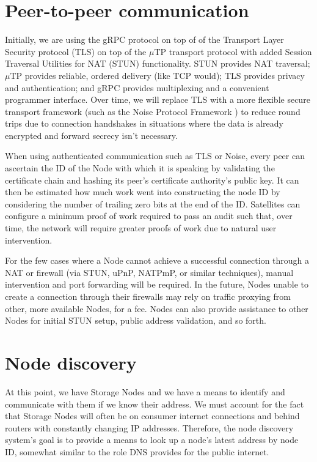 \documentclass[8pt,fleqn,openany]{book}
\begin{document}
\section{Peer-to-peer communication}

Initially, we are using the gRPC \cite{grpc} protocol on top of of the
Transport Layer Security protocol (TLS) on top of the $\mu$TP
\cite{utp} transport protocol with added Session Traversal Utilities for NAT
(STUN) functionality. STUN provides NAT traversal; $\mu$TP provides reliable,
ordered delivery (like TCP would); TLS provides privacy and authentication;
and gRPC provides multiplexing and a convenient programmer interface.
Over time, we will replace TLS with a more flexible secure transport
framework (such as the Noise Protocol Framework \cite{noise-proto}) to
reduce round trips due to connection handshakes in situations where the data is
already encrypted and forward secrecy isn't necessary.

When using authenticated communication such as TLS or Noise, every peer can
ascertain the ID of the Node with which it is
speaking by validating the certificate chain and hashing its peer's
certificate authority's public key. It can then be estimated how much work went
into constructing the node ID by considering the number of trailing zero bits
at the end of the ID.
Satellites can configure a minimum proof of work required to pass an
audit such that, over time, the network will require greater proofs of work
due to natural user intervention.

For the few cases where a Node cannot achieve a successful connection through a
NAT or firewall (via STUN, uPnP, NATPmP, or similar techniques), manual
intervention and port forwarding will be required. In the future, Nodes unable
to create a connection through their firewalls may rely on traffic proxying from
other, more available Nodes, for a fee. Nodes can also provide
assistance to other Nodes for initial STUN setup, public address validation,
and so forth.

\section{Node discovery}\label{sec:concrete-node-discovery}

At this point, we have Storage Nodes and we have a means to identify and
communicate with
them if we know their address. We must account for the fact that Storage Nodes
will often be on consumer internet connections and behind routers with
constantly changing IP
addresses. Therefore, the node discovery system's goal is to provide a means to look
up a node's latest address by node ID, somewhat similar to the role DNS
provides for the public internet.
\end{document}
